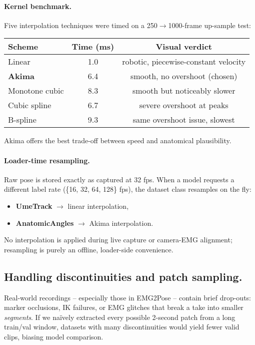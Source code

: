 \paragraph{Kernel benchmark.}
Five interpolation techniques were timed on a 250$\to$1000-frame up-sample test:

\begin{center}\small
\begin{tabular}{@{}lcc@{}}
\toprule
Scheme            & Time (ms) & Visual verdict \\ \midrule
Linear            & 1.0  & robotic, piecewise-constant velocity \\
\textbf{Akima}    & 6.4  & smooth, no overshoot (chosen) \\
Monotone cubic    & 8.3  & smooth but noticeably slower \\
Cubic spline      & 6.7  & severe overshoot at peaks \\
B-spline          & 9.3  & same overshoot issue, slowest \\ \bottomrule
\end{tabular}
\end{center}

Akima offers the best trade-off between speed and anatomical plausibility.

\paragraph{Loader-time resampling.}
Raw pose is stored exactly as captured at 32 fps.
When a model requests a different label rate (\{16, 32, 64, 128\} fps),
the dataset class resamples on the fly:

\begin{itemize}
  \item \textbf{UmeTrack} $\to$ linear interpolation,
  \item \textbf{AnatomicAngles} $\to$ Akima interpolation.
\end{itemize}

No interpolation is applied during live capture or camera-EMG alignment;
resampling is purely an offline, loader-side convenience.

\subsection{Handling discontinuities and patch sampling.}
Real-world recordings -- especially those in EMG2Pose -- contain brief drop-outs:
marker occlusions, IK failures, or EMG glitches that break a take into smaller
\emph{segments}. If we naïvely extracted every possible 2-second patch from a
long train/val window, datasets with many discontinuities would yield fewer
valid clips, biasing model comparison.

